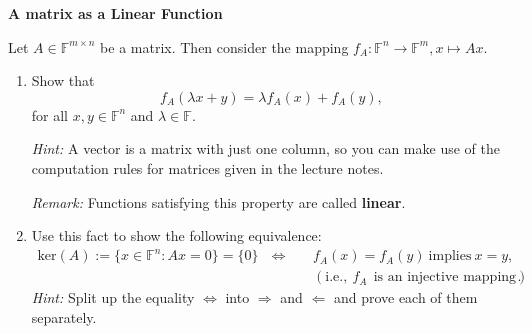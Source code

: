 \textbf{A matrix as a Linear Function}

Let $A \in \mathbb{F}^{m\times n}$ be a matrix. Then consider the mapping $f_A\colon \mathbb{F}^{n} \to \mathbb{F}^{m}, x \mapsto Ax$.
\begin{enumerate}
\item Show that
$$f_A(\lambda x+y) = \lambda f_A(x) + f_A(y), \nonumber$$
for all $x,y \in \mathbb{F}^{n} $ and $\lambda \in \mathbb{F}$.

\textit{Hint:} A vector is a matrix with just one column, so you can make use of the computation rules for matrices given in the lecture notes.  

\textit{Remark:} Functions satisfying this property are called \textbf{linear}.  

\item Use this fact to show the following equivalence:
\begin{align*}
\text{ker}(A):=\{x \in \mathbb{F}^n\colon Ax=0 \}  = \{0\}~~~\Leftrightarrow  ~~~~& f_A(x) = f_A(y) ~\text{implies}~ x=y,~ \\
&(\text{i.e.},~f_A ~~\text{is an injective mapping}).
\end{align*}
\textit{Hint:} Split up the equality $\Leftrightarrow $ into  $\Rightarrow $ and $\Leftarrow$ and prove each of them separately.
\end{enumerate}


